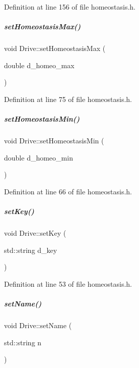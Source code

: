 Definition at line 156 of file homeostasis.\+h.

\mbox{\label{group__homeostasis_a54a7b939ea363a8c1bd4433929921f28}} 
\subparagraph{\texorpdfstring{set\+Homeostasis\+Max()}{setHomeostasisMax()}}
{\footnotesize\ttfamily void Drive\+::set\+Homeostasis\+Max (\begin{DoxyParamCaption}\item[{double}]{d\+\_\+homeo\+\_\+max }\end{DoxyParamCaption})\hspace{0.3cm}{\ttfamily [inline]}}



Definition at line 75 of file homeostasis.\+h.

\mbox{\label{group__homeostasis_acc9e502d6f8b11e9d66355fb16effdbd}} 
\subparagraph{\texorpdfstring{set\+Homeostasis\+Min()}{setHomeostasisMin()}}
{\footnotesize\ttfamily void Drive\+::set\+Homeostasis\+Min (\begin{DoxyParamCaption}\item[{double}]{d\+\_\+homeo\+\_\+min }\end{DoxyParamCaption})\hspace{0.3cm}{\ttfamily [inline]}}



Definition at line 66 of file homeostasis.\+h.

\mbox{\label{group__homeostasis_aa66a1525b86bf51c0d8d30172766a98b}} 
\subparagraph{\texorpdfstring{set\+Key()}{setKey()}}
{\footnotesize\ttfamily void Drive\+::set\+Key (\begin{DoxyParamCaption}\item[{std\+::string}]{d\+\_\+key }\end{DoxyParamCaption})\hspace{0.3cm}{\ttfamily [inline]}}



Definition at line 53 of file homeostasis.\+h.

\mbox{\label{group__homeostasis_a931a1c03efb3c846d317160739f34f7a}} 
\subparagraph{\texorpdfstring{set\+Name()}{setName()}}
{\footnotesize\ttfamily void Drive\+::set\+Name (\begin{DoxyParamCaption}\item[{std\+::string}]{n }\end{DoxyParamCaption})\hspace{0.3cm}{\ttfamily [inline]}}



